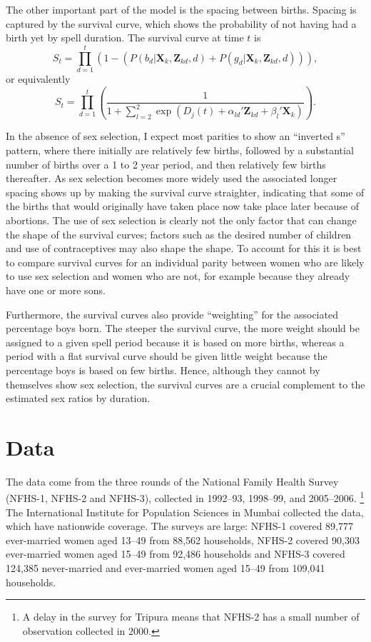 \documentclass[12pt,letterpaper]{article}
\begin{document}
The other important part of the model is the spacing between births.
Spacing is captured by the survival curve, which shows the probability of not 
having had a birth yet by spell duration.
The survival curve at time $t$ is 
\begin{equation}
S_{t} 
= 
\prod_{d=1}^t 
\left( 
	1- \left(P(b_{d} | \mathbf{X}_{k}, \mathbf{Z}_{kd}, d) 
	+ P(g_{d} | \mathbf{X}_{k}, \mathbf{Z}_{kd}, d) \right) 
\right),
 \label{eq:survival}
\end{equation}
or equivalently
\begin{equation}
S_{t} 
= 
\prod_{d=1}^t
\left(
\frac{ 1 }
{1 + \sum_{l=2}^2 \exp(D_j(t) + \alpha_{ld}'\mathbf{Z}_{kd} + \beta_l'\mathbf{X}_{k})}
\right).
\end{equation}

In the absence of sex selection, I expect most parities to show an 
``inverted s'' pattern, where there initially are relatively few births, 
followed by a substantial number of births over a 1 to 2 year period, and then
relatively few births thereafter.
As sex selection becomes more widely used the associated
longer spacing shows up by making the survival curve straighter,
indicating that some of the births that would originally have taken place
now take place later because of abortions.
The use of sex selection is clearly not the only factor that can change the shape of
the survival curves; factors such as the desired number of children and
use of contraceptives may also shape the shape.
To account for this it is best to compare survival curves for an individual
parity between women who are likely to use sex selection and women who are
not, for example because they already have one or more sons.

Furthermore, the survival curves also provide ``weighting'' for the 
associated percentage boys born.
The steeper the survival curve, the more weight should be assigned to a given
spell period because it is based on more births, 
whereas a period with a flat survival curve should be given little weight because the 
percentage boys is based on few births.
Hence, although they cannot by themselves show sex selection, the survival
curves are a crucial complement to the estimated sex ratios by duration.


\section{Data\label{sec:data}}

The data come from the three rounds of the National Family Health Survey 
(NFHS-1, NFHS-2 and NFHS-3),
collected in 1992--93, 1998--99, and 2005--2006.%
\footnote{
A delay in the survey for Tripura means that NFHS-2 has a small number of observation 
collected in 2000.
}
The International Institute for Population Sciences in Mumbai collected the data,
which have nationwide coverage.
The surveys are large: NFHS-1 covered 89,777 ever-married women 
aged 13--49 from 88,562 households,
NFHS-2 covered 90,303 ever-married women aged 15--49 from 92,486 households
and NFHS-3 covered 124,385 never-married and ever-married women aged 
15--49 from 109,041 households.
\end{document}
